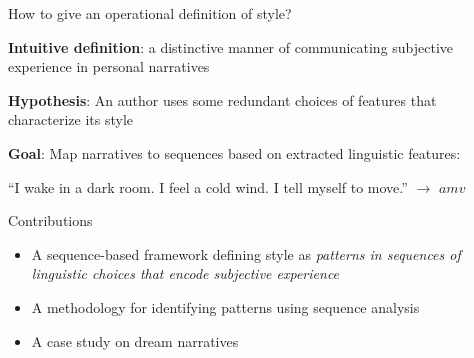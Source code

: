 \documentclass[handout,10pt]{beamer}
\begin{document}
\begin{frame}{How to give an operational definition of style?}

\textbf{Intuitive definition}: a distinctive manner of communicating subjective experience in personal narratives

\vspace{0.5cm}
\pause

\textbf{Hypothesis}: An author uses some redundant choices of features that characterize its style

\vspace{0.5cm}
\pause

\textbf{Goal}: Map narratives to sequences based on extracted linguistic features:

“I wake in a dark room. I feel a cold wind. I tell myself to move.” $\rightarrow$ $amv$


    
\end{frame}

\begin{frame}{Contributions}

\begin{itemize}[<+->]
    \item A sequence-based framework defining style as \textit{patterns in sequences of linguistic choices that encode subjective experience}%
    \item A methodology for identifying patterns using sequence analysis
    \item A case study on dream narratives %
\end{itemize}
    
\end{frame}
\end{document}
